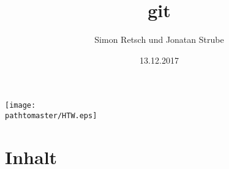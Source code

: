 \documentclass[11pt]{beamer}
\author{Simon Retsch und Jonatan Strube}
\title{git}
\date{13.12.2017}
\gdef\pathtomaster{_LaTeX_master}
\begin{document}
\begin{frame}[plain]
\begin{center}
\texttt{[image: \\pathtomaster/HTW.eps]}
\end{center}
\maketitle
\end{frame}

\section*{Inhalt}
\begin{frame}
\tableofcontents
\end{frame}







%
%
%
%
%
%
%
%
\end{document}
